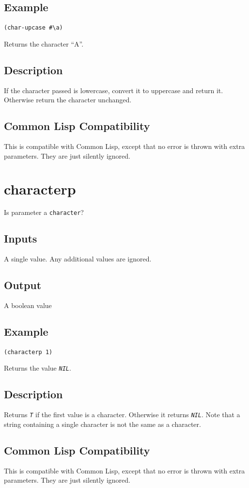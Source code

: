 \documentclass[10pt, openany]{book}
\newcommand{\constant}[1]{\emph{\texttt{#1}}}
\newcommand{\datatype}[1]{\texttt{#1}}
\newcommand{\cl}{Common Lisp}
\begin{document}
\subsection{Example}
\begin{lstlisting}
(char-upcase #\a)
\end{lstlisting}
Returns the character ``A''.
\subsection{Description}
If the character passed is lowercase, convert it to uppercase and return it.  Otherwise return the character unchanged.
\subsection{Common Lisp Compatibility}
This is compatible with \cl, except that no error is thrown with extra parameters.  They are just silently ignored.

\section{characterp}
Is parameter a \datatype{character}?
\subsection{Inputs}
A single value.  Any additional values are ignored.
\subsection{Output}
A boolean value
\subsection{Example}
\begin{lstlisting}
(characterp 1)
\end{lstlisting}
Returns the value \constant{NIL}.
\subsection{Description}
Returns \constant{T} if the first value is a character.  Otherwise it returns \constant{NIL}.  Note that a string containing a single character is not the same as a character.
\subsection{Common Lisp Compatibility}
This is compatible with \cl, except that no error is thrown with extra parameters.  They are just silently ignored.
\end{document}
